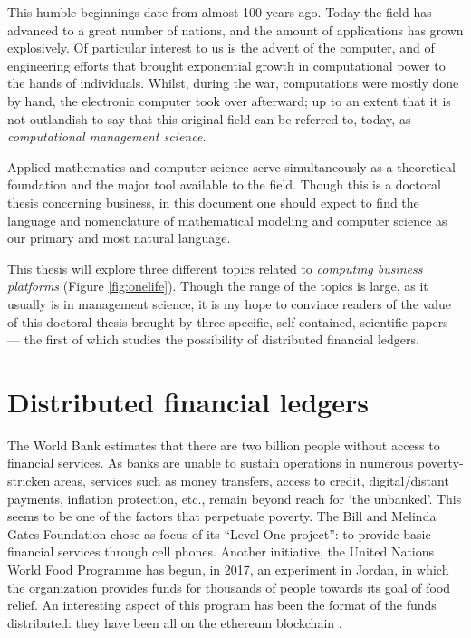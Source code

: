 This humble beginnings date from almost 100 years ago. Today the field has advanced to a great number of nations, and the amount of applications has grown explosively.  Of particular interest to us is the advent of the computer, and of engineering efforts that brought exponential growth in computational power to the hands of individuals.  Whilst, during the war, computations were mostly done by hand, the electronic computer took over afterward; up to an extent that it is not outlandish to say that this original field can be referred to, today, as \emph{computational management science}.

Applied mathematics and computer science serve simultaneously as a theoretical foundation and the major tool available to the field.  Though this is a doctoral thesis concerning business, in this document one should expect to find the language and nomenclature of mathematical modeling and computer science as our primary and most natural language.

This thesis will explore three different topics related to \emph{computing business platforms} (Figure \ref{fig:onelife}). Though the range of the topics is large, as it usually is in management science, it is my hope to convince readers of the value of this doctoral thesis brought by three specific, self-contained, scientific papers --- the first of which studies the possibility of distributed financial ledgers.

\section{Distributed financial ledgers}

The World Bank estimates that there are two billion people without access to financial services. As banks are unable to sustain operations in numerous poverty-stricken areas, services such as money transfers, access to credit, digital/distant payments, inflation protection, etc., remain beyond reach for `the unbanked'.  This seems to be one of the factors that perpetuate poverty.  The Bill and Melinda Gates Foundation chose as focus of its ``Level-One project'': to provide basic financial services through cell phones. Another initiative, the United Nations World Food Programme has begun, in 2017, an experiment in Jordan, in which the organization provides funds for thousands of people towards its goal of food relief.  An interesting aspect of this program has been the format of the funds distributed:  they have been all on the ethereum blockchain \citep{woyke2017blockchain, UN-you-pay-we-take-the-photo, UNFOODPROG}.

